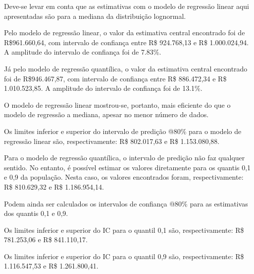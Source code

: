\documentclass[a4paper, 12pt]{article}
\begin{document}
Deve-se levar em conta que as estimativas com o modelo de regressão
linear aqui apresentadas são para a mediana da distribuição lognormal.

Pelo modelo de regressão linear, o valor da estimativa central
encontrado foi de R\$961.660,64, com intervalo de confiança entre R\$
924.768,13 e R\$ 1.000.024,94. A amplitude do intervalo de confiança foi
de 7.83\%.

Já pelo modelo de regressão quantílica, o valor da estimativa central
encontrado foi de R\$946.467,87, com intervalo de confiança entre R\$
886.472,34 e R\$ 1.010.523,85. A amplitude do intervalo de confiança foi
de 13.1\%.

O modelo de regressão linear mostrou-se, portanto, mais eficiente do que
o modelo de regressão a mediana, apesar no menor número de dados.

Os limites inferior e superior do intervalo de predição @80\% para o
modelo de regressão linear são, respectivamente: R\$ 802.017,63 e R\$
1.153.080,88.

Para o modelo de regressão quantílica, o intervalo de predição não faz
qualquer sentido. No entanto, é possível estimar os valores diretamente
para os quantis 0,1 e 0,9 da população. Nesta caso, os valores
encontrados foram, respectivamente: R\$ 810.629,32 e R\$ 1.186.954,14.

Podem ainda ser calculados os intervalos de confiança @80\% para as
estimativas dos quantis 0,1 e 0,9.

Os limites inferior e superior do IC para o quantil 0,1 são,
respectivamente: R\$ 781.253,06 e R\$ 841.110,17.

Os limites inferior e superior do IC para o quantil 0,9 são,
respectivamente: R\$ 1.116.547,53 e R\$ 1.261.800,41.

\printbibliography[title=Referências]
\end{document}
